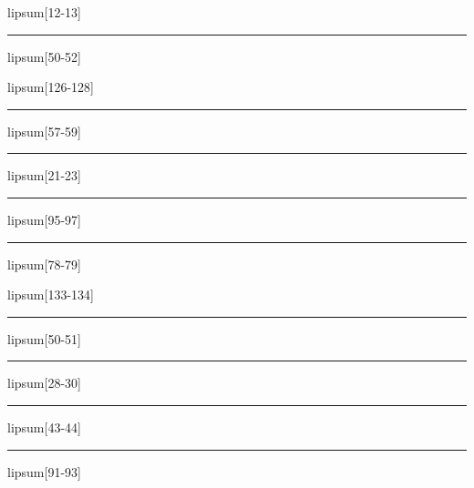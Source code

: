 \documentclass[11pt,a4paper]{article}
\begin{document}
lipsum[12-13]

\begin{simplewrap}
  \textcolor{purple!21}{\rule{5.6cm}{3.6cm}}
\end{simplewrap}
lipsum[50-52]

lipsum[126-128]

\begin{simplewrap}
  \textcolor{cyan!49}{\rule{5.1cm}{4.0cm}}
\end{simplewrap}
lipsum[57-59]

\begin{simplewrap}
  \textcolor{green!10}{\rule{5.8cm}{3.7cm}}
\end{simplewrap}
lipsum[21-23]

\begin{simplewrap}
  \textcolor{blue!33}{\rule{4.7cm}{9.5cm}}
\end{simplewrap}
lipsum[95-97]

\begin{simplewrap}
  \textcolor{blue!49}{\rule{3.8cm}{2.3cm}}
\end{simplewrap}
lipsum[78-79]

lipsum[133-134]

\begin{simplewrap}
  \textcolor{orange!16}{\rule{5.2cm}{6.3cm}}
\end{simplewrap}
lipsum[50-51]

\begin{simplewrap}
  \textcolor{magenta!46}{\rule{4.9cm}{3.4cm}}
\end{simplewrap}
lipsum[28-30]

\begin{simplewrap}
  \textcolor{lime!53}{\rule{4.4cm}{7.3cm}}
\end{simplewrap}
lipsum[43-44]

\begin{simplewrap}
  \textcolor{magenta!35}{\rule{4.5cm}{7.3cm}}
\end{simplewrap}
lipsum[91-93]
\end{document}
